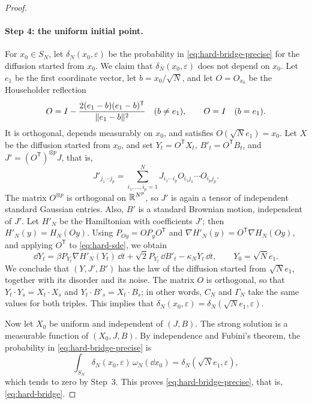 \begin{proof}
\paragraph{Step 4: the uniform initial point.}
For $x_0\in S_N$, let $\delta_N(x_0,\varepsilon)$ be the probability in \eqref{eq:hard-bridge-precise} for the diffusion started from $x_0$. We claim that $\delta_N(x_0,\varepsilon)$ does not depend on $x_0$. Let $e_1$ be the first coordinate vector, let $b=x_0/\sqrt N$, and let $O=O_{x_0}$ be the Householder reflection
\[
 O=I-\frac{2(e_1-b)(e_1-b)^{\mathsf T}}{\lVert e_1-b\rVert^2}\quad(b\ne e_1),\qquad O=I\quad(b=e_1).
\]
It is orthogonal, depends measurably on $x_0$, and satisfies $O(\sqrt N e_1)=x_0$. Let $X$ be the diffusion started from $x_0$, and set $Y_t=O^{\mathsf T}X_t$, $B'_t=O^{\mathsf T}B_t$, and $J'=(O^{\mathsf T})^{\otimes p}J$, that is,
\[
 J'_{j_1\cdots j_p}=\sum_{i_1,\ldots,i_p=1}^NJ_{i_1\cdots i_p}O_{i_1j_1}\cdots O_{i_pj_p}.
\]
The matrix $O^{\otimes p}$ is orthogonal on $\mathbb R^{N^p}$, so $J'$ is again a tensor of independent standard Gaussian entries. Also, $B'$ is a standard Brownian motion, independent of $J'$. Let $H'_N$ be the Hamiltonian with coefficients $J'$; then $H'_N(y)=H_N(Oy)$. Using $P_{Oy}=OP_yO^{\mathsf T}$ and $\nabla H'_N(y)=O^{\mathsf T}\nabla H_N(Oy)$, and applying $O^{\mathsf T}$ to \eqref{eq:hard-sde}, we obtain
\[
 \dd Y_t=\beta P_{Y_t}\nabla H'_N(Y_t)\,\dd t+\sqrt2P_{Y_t}\,\dd B'_t-\kappa_NY_t\,\dd t,\qquad Y_0=\sqrt Ne_1.
\]
We conclude that $(Y,J',B')$ has the law of the diffusion started from $\sqrt Ne_1$, together with its disorder and its noise. The matrix $O$ is orthogonal, so that $Y_t\cdot Y_s=X_t\cdot X_s$ and $Y_t\cdot B'_s=X_t\cdot B_s$; in other words, $C_N$ and $\Gamma_N$ take the same values for both triples. This implies that $\delta_N(x_0,\varepsilon)=\delta_N(\sqrt Ne_1,\varepsilon)$.

Now let $X_0$ be uniform and independent of $(J,B)$. The strong solution is a measurable function of $(X_0,J,B)$. By independence and Fubini's theorem, the probability in \eqref{eq:hard-bridge-precise} is
\[
 \int_{S_N}\delta_N(x_0,\varepsilon)\,\omega_N(\dd x_0)=\delta_N(\sqrt Ne_1,\varepsilon),
\]
which tends to zero by Step~3. This proves \eqref{eq:hard-bridge-precise}, that is, \eqref{eq:hard-bridge}.


\end{proof}
